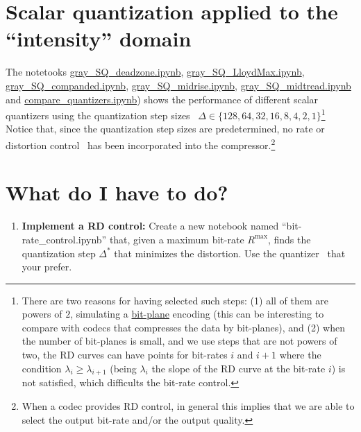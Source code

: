 \section{Scalar quantization applied to the ``intensity'' domain}
The notetooks
\href{https://github.com/Sistemas-Multimedia/Sistemas-Multimedia.github.io/blob/master/contents/gray_SQ/gray_SQ_deadzone.ipynb}{gray\_SQ\_deadzone.ipynb},
\href{https://github.com/Sistemas-Multimedia/Sistemas-Multimedia.github.io/blob/master/contents/gray_SQ/gray_SQ_LloydMax.ipynb}{gray\_SQ\_LloydMax.ipynb},
\href{https://github.com/Sistemas-Multimedia/Sistemas-Multimedia.github.io/blob/master/contents/gray_SQ/gray_SQ_companded.ipynb}{gray\_SQ\_companded.ipynb},
\href{https://github.com/Sistemas-Multimedia/Sistemas-Multimedia.github.io/blob/master/contents/gray_SQ/gray_SQ_midrise.ipynb}{gray\_SQ\_midrise.ipynb},
\href{https://github.com/Sistemas-Multimedia/Sistemas-Multimedia.github.io/blob/master/contents/gray_SQ/gray_SQ_midtread.ipynb}{gray\_SQ\_midtread.ipynb}
and
\href{https://github.com/Sistemas-Multimedia/Sistemas-Multimedia.github.io/blob/master/contents/gray_SQ/compare_quantizers.ipynb}{compare\_quantizers.ipynb})
shows the performance of different scalar quantizers using the
quantization step sizes~\cite{vruiz__scalar_quantization}
$\Delta\in\{128, 64, 32, 16, 8, 4, 2, 1\}$\footnote{There are two
reasons for having selected such steps: (1) all of them are powers of
$2$, simulating a
\href{https://en.wikipedia.org/wiki/Bit_plane}{bit-plane} encoding
(this can be interesting to compare with codecs that compresses the
data by bit-planes), and (2) when the number of bit-planes is small,
and we use steps that are not powers of two, the RD curves can have
points for bit-rates $i$ and $i+1$ where the condition
$\lambda_i\ge\lambda_{i+1}$ (being $\lambda_i$ the slope of the RD
curve at the bit-rate $i$) is not satisfied, which difficults the
bit-rate control.} Notice that, since the quantization step sizes are
predetermined, no rate or distortion
control~\cite{vruiz__information_theory} has been incorporated into
the compressor.\footnote{When a codec provides RD control, in general
this implies that we are able to select the output bit-rate and/or the
output quality.}

\section{What do I have to do?}
\begin{enumerate}
\item \textbf{Implement a RD control:} Create a new notebook named
  ``bit-rate\_control.ipynb'' that, given a maximum bit-rate
  $R^\text{max}$, finds the quantization step $\Delta^*$ that
  minimizes the distortion. Use the
  quantizer~\cite{vruiz__scalar_quantization} that your prefer.
\end{enumerate}


